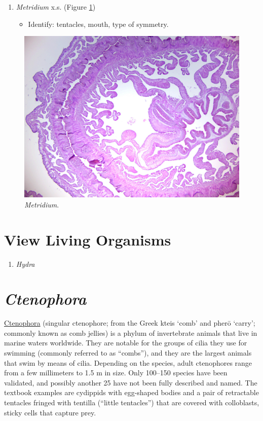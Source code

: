 \begin{enumerate}
\def\labelenumi{\arabic{enumi}.}
\tightlist
\item
  \emph{Metridium} x.s. (Figure \ref{fig:metridiumxs})

  \begin{itemize}
  \tightlist
  \item
    Identify: tentacles, mouth, type of symmetry.
  \end{itemize}
\end{enumerate}

\begin{figure}

{\centering \includegraphics[width=0.7\linewidth]{./figures/porifera/metridium}

}

\caption{\emph{Metridium}.}\label{fig:metridiumxs}
\end{figure}

\section{View Living Organisms}\label{view-living-organisms-2}

\begin{enumerate}
\def\labelenumi{\arabic{enumi}.}
\tightlist
\item
  \emph{Hydra}
\end{enumerate}

\section{\texorpdfstring{\emph{Ctenophora}}{Ctenophora}}\label{ctenophora}

\href{https://en.wikipedia.org/wiki/Ctenophora}{Ctenophora} (singular
ctenophore; from the Greek kteis `comb' and pherō `carry'; commonly
known as comb jellies) is a phylum of invertebrate animals that live in
marine waters worldwide. They are notable for the groups of cilia they
use for swimming (commonly referred to as ``combs''), and they are the
largest animals that swim by means of cilia. Depending on the species,
adult ctenophores range from a few millimeters to 1.5 m in size. Only
100--150 species have been validated, and possibly another 25 have not
been fully described and named. The textbook examples are cydippids with
egg-shaped bodies and a pair of retractable tentacles fringed with
tentilla (``little tentacles'') that are covered with colloblasts,
sticky cells that capture prey.

